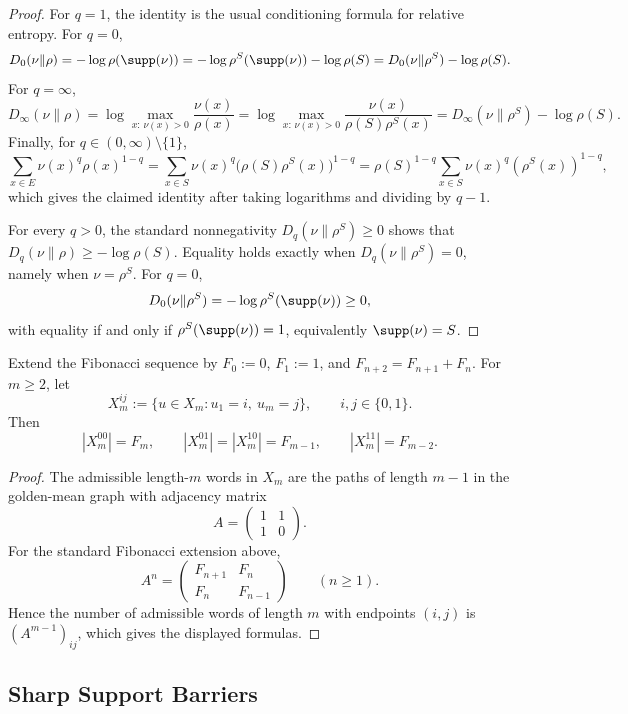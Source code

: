 \begin{proof}
For \(q=1\), the identity is the usual conditioning formula for relative
entropy. For \(q=0\),
\[
D_0(\nu\|\rho)
=
-\log \rho(\supp(\nu))
=
-\log \rho^S(\supp(\nu))-\log \rho(S)
=
D_0(\nu\|\rho^S)-\log \rho(S).
\]
For \(q=\infty\),
\[
D_\infty(\nu\|\rho)
=
\log\max_{x:\,\nu(x)>0}\frac{\nu(x)}{\rho(x)}
=
\log\max_{x:\,\nu(x)>0}\frac{\nu(x)}{\rho(S)\rho^S(x)}
=
D_\infty(\nu\|\rho^S)-\log \rho(S).
\]
Finally, for \(q\in(0,\infty)\setminus\{1\}\),
\[
\sum_{x\in E}\nu(x)^q\rho(x)^{1-q}
=
\sum_{x\in S}\nu(x)^q\bigl(\rho(S)\rho^S(x)\bigr)^{1-q}
=
\rho(S)^{1-q}\sum_{x\in S}\nu(x)^q(\rho^S(x))^{1-q},
\]
which gives the claimed identity after taking logarithms and dividing by
\(q-1\).

For every \(q>0\), the standard nonnegativity \(D_q(\nu\|\rho^S)\ge 0\) shows
that \(D_q(\nu\|\rho)\ge -\log\rho(S)\). Equality holds exactly when
\(D_q(\nu\|\rho^S)=0\), namely when \(\nu=\rho^S\). For \(q=0\),
\[
D_0(\nu\|\rho^S)=-\log \rho^S(\supp(\nu))\ge 0,
\]
with equality if and only if \(\rho^S(\supp(\nu))=1\), equivalently
\(\supp(\nu)=S\).
\end{proof}

\begin{lemma}\label{lem:endpoint-class-counts}
Extend the Fibonacci sequence by \(F_0:=0\), \(F_1:=1\), and
\(F_{n+2}=F_{n+1}+F_n\). For \(m\ge 2\), let
\[
X_m^{ij}:=\{u\in X_m:u_1=i,\ u_m=j\},
\qquad i,j\in\{0,1\}.
\]
Then
\[
|X_m^{00}|=F_m,\qquad
|X_m^{01}|=|X_m^{10}|=F_{m-1},\qquad
|X_m^{11}|=F_{m-2}.
\]
\end{lemma}

\begin{proof}
The admissible length-\(m\) words in \(X_m\) are the paths of length \(m-1\) in
the golden-mean graph with adjacency matrix
\[
A=\begin{pmatrix}1&1\\1&0\end{pmatrix}.
\]
For the standard Fibonacci extension above,
\[
A^n=
\begin{pmatrix}
F_{n+1} & F_n\\
F_n & F_{n-1}
\end{pmatrix}
\qquad (n\ge 1).
\]
Hence the number of admissible words of length \(m\) with endpoints \((i,j)\) is
\((A^{m-1})_{ij}\), which gives the displayed formulas.
\end{proof}

\subsection{Sharp Support Barriers}

